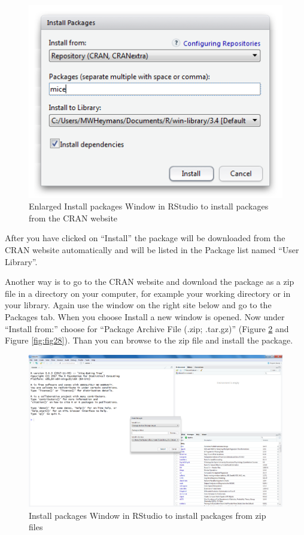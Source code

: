 \documentclass[]{book}
\begin{document}
\begin{figure}

{\centering \includegraphics[width=0.95\linewidth]{images/fig1.25b} 

}

\caption{Enlarged Install packages Window in RStudio to install packages from the CRAN website}\label{fig:fig26}
\end{figure}

After you have clicked on ``Install'' the package will be downloaded
from the CRAN website automatically and will be listed in the Package
list named ``User Library''.

Another way is to go to the CRAN website and download the package as a
zip file in a directory on your computer, for example your working
directory or in your library. Again use the window on the right site
below and go to the Packages tab. When you choose Install a new window
is opened. Now under ``Install from:'' choose for ``Package Archive File
(.zip; .tar.gz)'' (Figure \ref{fig:fig27} and Figure \ref{fig:fig28}).
Than you can browse to the zip file and install the package.

\begin{figure}

{\centering \includegraphics[width=0.95\linewidth]{images/fig1.26a} 

}

\caption{Install packages Window in RStudio to install packages from zip files}\label{fig:fig27}
\end{figure}
\end{document}
